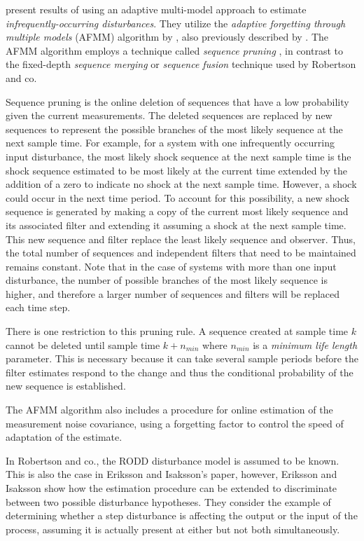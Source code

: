 \cite{eriksson_classification_1996} present results of using an adaptive multi-model approach to estimate \textit{infrequently-occurring disturbances}. They utilize the \textit{adaptive forgetting through multiple models} (AFMM) algorithm by \cite{andersson_adaptive_1985}, also previously described by \cite{gustafsson_estimation_1993}. The AFMM algorithm employs a technique called \textit{sequence pruning} \cite{tugnait_detection_1982}, in contrast to the fixed-depth \textit{sequence merging} or \textit{sequence fusion} technique \citep{blom_interacting_1988} used by Robertson and co.

Sequence pruning is the online deletion of sequences that have a low probability given the current measurements. The deleted sequences are replaced by new sequences to represent the possible branches of the most likely sequence at the next sample time. For example, for a system with one infrequently occurring input disturbance, the most likely shock sequence at the next sample time is the shock sequence estimated to be most likely at the current time extended by the addition of a zero to indicate no shock at the next sample time. However, a shock could occur in the next time period. To account for this possibility, a new shock sequence is generated by making a copy of the current most likely sequence and its associated filter and extending it assuming a shock at the next sample time. This new sequence and filter replace the least likely sequence and observer. Thus, the total number of sequences and independent filters that need to be maintained remains constant. Note that in the case of systems with more than one input disturbance, the number of possible branches of the most likely sequence is higher, and therefore a larger number of sequences and filters will be replaced each time step.

There is one restriction to this pruning rule. A sequence created at sample time $k$ cannot be deleted until sample time $k+n_{min}$ where $n_{min}$ is a \textit{minimum life length} parameter. This is necessary because it can take several sample periods before the filter estimates respond to the change and thus the conditional probability of the new sequence is established.

The AFMM algorithm also includes a procedure for online estimation of the measurement noise covariance, using a forgetting factor to control the speed of adaptation of the estimate.\cite{andersson_adaptive_1985}

In Robertson and co., the RODD disturbance model is assumed to be known. This is also the case in Eriksson and Isaksson's paper, however, Eriksson and Isaksson show how the estimation procedure can be extended to discriminate between two possible disturbance hypotheses. They consider the example of determining whether a step disturbance is affecting the output or the input of the process, assuming it is actually present at either but not both simultaneously.

